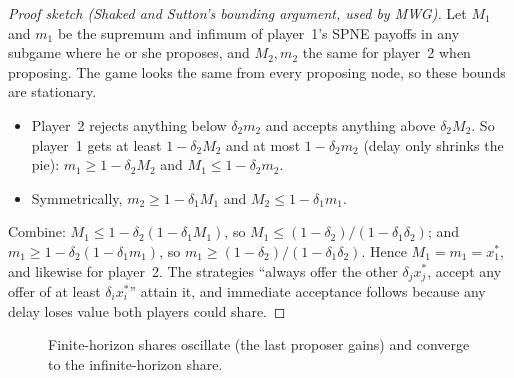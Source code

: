 \begin{proof}[Proof sketch (Shaked and Sutton's bounding argument, used by MWG)]
Let $M_1$ and $m_1$ be the supremum and infimum of player~1's SPNE payoffs in any subgame where
he or she proposes, and $M_2, m_2$ the same for player~2 when proposing. The game looks the same
from every proposing node, so these bounds are stationary.
\begin{itemize}
  \item Player~2 rejects anything below $\delta_2 m_2$ and accepts anything above $\delta_2 M_2$.
  So player~1 gets at least $1 - \delta_2 M_2$ and at most $1 - \delta_2 m_2$ (delay only shrinks
  the pie): $m_1 \ge 1 - \delta_2 M_2$ and $M_1 \le 1 - \delta_2 m_2$.
  \item Symmetrically, $m_2 \ge 1 - \delta_1 M_1$ and $M_2 \le 1 - \delta_1 m_1$.
\end{itemize}
Combine: $M_1 \le 1 - \delta_2(1 - \delta_1 M_1)$, so $M_1 \le (1-\delta_2)/(1-\delta_1\delta_2)$;
and $m_1 \ge 1 - \delta_2(1 - \delta_1 m_1)$, so $m_1 \ge (1-\delta_2)/(1-\delta_1\delta_2)$. Hence
$M_1 = m_1 = x_1^*$, and likewise for player~2. The strategies ``always offer the other
$\delta_j x_j^*$, accept any offer of at least $\delta_i x_i^*$'' attain it, and immediate acceptance
follows because any delay loses value both players could share.
\end{proof}

\begin{figure}[ht]
\centering
{}
\caption{Finite-horizon shares oscillate (the last proposer gains) and converge to the
infinite-horizon share.}
\end{figure}

